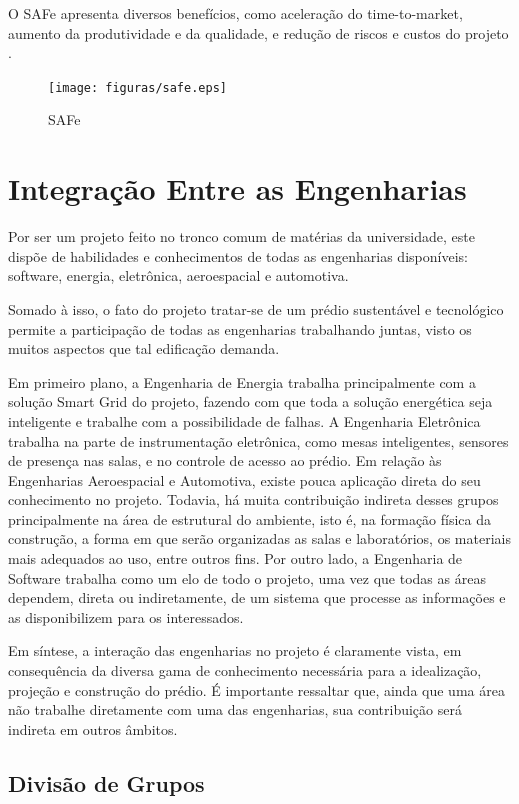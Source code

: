  O SAFe apresenta diversos benefícios, como aceleração do time-to-market, aumento da produtividade e da qualidade, e
 redução de riscos e custos do projeto \cite{turetken2016}.

 \begin{figure}[!h]
 	\centering
 	\texttt{[image: figuras/safe.eps]}
 	\caption{SAFe}
 	\label{fig01}
 \end{figure}

\section{Integração Entre as Engenharias}
Por ser um projeto feito no tronco comum de matérias da universidade, este dispõe de habilidades e conhecimentos de todas as engenharias disponíveis: software, energia, eletrônica, aeroespacial e automotiva.

Somado à isso, o fato do projeto tratar-se de um prédio sustentável e tecnológico permite a participação de todas as engenharias trabalhando juntas, visto os muitos aspectos que tal edificação demanda.

Em primeiro plano, a Engenharia de Energia trabalha principalmente com a solução Smart Grid do projeto, fazendo com que toda a solução energética seja inteligente e trabalhe com a possibilidade de falhas. A Engenharia Eletrônica trabalha na parte de instrumentação eletrônica, como mesas inteligentes, sensores de presença nas salas, e no controle de acesso ao prédio. Em relação às Engenharias Aeroespacial e Automotiva, existe pouca aplicação direta do seu conhecimento no projeto. Todavia, há muita contribuição indireta desses grupos principalmente na área de estrutural do ambiente, isto é, na formação física da construção, a forma em que serão organizadas as salas e laboratórios, os materiais mais adequados ao uso, entre outros fins. Por outro lado, a Engenharia de Software trabalha como um elo de todo o projeto, uma vez que todas as áreas dependem, direta ou indiretamente, de um sistema que processe as informações e as disponibilizem para os interessados.

Em síntese, a interação das engenharias no projeto é claramente vista, em consequência da diversa gama de conhecimento necessária para a idealização, projeção e construção do prédio. É importante ressaltar que, ainda que uma área não trabalhe diretamente com uma das engenharias, sua contribuição será indireta em outros âmbitos.

\subsection{Divisão de Grupos\label{subsec:divisao}}

